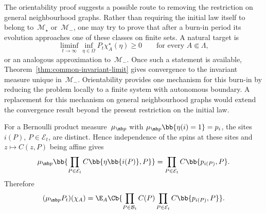 The orientability proof suggests a possible route to removing the restriction
on general neighbourhood graphs. Rather than requiring the initial law itself
to belong to~$\mathcal M_\star$ or~$\mathcal M_-$, one may try to prove
that after a burn-in period its evolution approaches one of these classes on
finite sets. A natural target is
\begin{equation*}
\liminf_{t\to\infty}
\inf_{\eta\in\Omega}
P_t\chi_A^\star(\eta)
\geq0
\qquad
\text{for every }A\Subset\Lambda,
\end{equation*}
or an analogous approximation to~$\mathcal M_-$. Once such a statement is
available, Theorem~\ref{thm:common-invariant-limit} gives convergence to the invariant measure unique in~$\mathcal{M}_-$. Orientability provides one mechanism for this
burn-in by reducing the problem locally to a finite system with autonomous
boundary. A replacement for this mechanism on general neighbourhood
graphs would extend the convergence result beyond the present restriction on
the initial law.


For a Bernoulli product measure~$\mu_{\mb p}$ with
$\mu_{\mb p}\bb{\eta(i)=1}=p_i$, the sites~$i(P)$,
$P\in\mathcal E_t$, are distinct. Hence independence of the spins at these
sites and~$z\mapsto C(z,P)$ being affine gives
\begin{equation*}
\mu_{\mb p}\bb{
\prod_{P\in\mathcal E_t}C\bb{\eta\bb{i(P)},P}
}
=
\prod_{P\in\mathcal E_t}
C\bb{p_{i(P)},P}.
\end{equation*}
Therefore
\begin{equation}
\label{eq:patch-representation-product-law}
(\mu_{\mb p}P_t)(\chi_A)
=
\E_A\Cb{
\prod_{P\in\mathcal B_t}C(P)
\prod_{P\in\mathcal E_t}C\bb{p_{i(P)},P}
}.
\end{equation}

